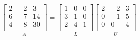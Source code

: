 \documentclass[12pt]{article}
\begin{document}
\begin{equation*}
  \underset{A}{
    \begin{bmatrix}
      2 & -2 & 3\\
      6 & -7 & 14\\
      4 & -8 & 30\\
    \end{bmatrix}
  }
  =
  \underset{L}{
    \begin{bmatrix}
      1 & 0 & 0\\
      3 & 1 & 0\\
      2 & 4 & 1\\
    \end{bmatrix}
  }
  \underset{U}{
    \begin{bmatrix}
      2 & -2 & 3\\
      0 & -1 & 5\\
      0 & 0 & 4\\
    \end{bmatrix}
  }
\end{equation*}
\end{document}
